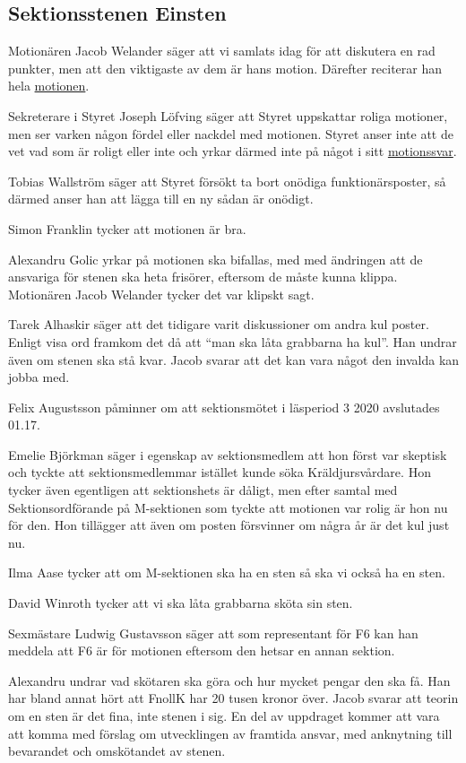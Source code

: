 \documentclass[hidelinks]{sektionsmote}
\begin{document}
\subsection{Sektionsstenen Einsten}
Motionären Jacob Welander säger att vi samlats idag för att diskutera en rad punkter, men att den viktigaste av dem är hans motion.
Därefter reciterar han hela \hyperlink{bilagor/motionfnollk.pdf.1}{motionen}.\par
Sekreterare i Styret Joseph Löfving säger att Styret uppskattar roliga motioner, men ser varken någon fördel eller nackdel med motionen.
Styret anser inte att de vet vad som är roligt eller inte och yrkar därmed inte på något i sitt \hyperlink{bilagor/motionfnollk.svar.pdf.1}{motionssvar}.\par
Tobias Wallström säger att Styret försökt ta bort onödiga funktionärsposter, så därmed anser han att lägga till en ny sådan är onödigt.\par
Simon Franklin tycker att motionen är bra.\par
Alexandru Golic yrkar på motionen ska bifallas, med med ändringen att de ansvariga för stenen ska heta frisörer, eftersom de måste kunna klippa.
Motionären Jacob Welander tycker det var klipskt sagt.\par
Tarek Alhaskir säger att det tidigare varit diskussioner om andra kul poster.
Enligt visa ord framkom det då att \enquote{man ska låta grabbarna ha kul}.
Han undrar även om stenen ska stå kvar.
Jacob svarar att det kan vara något den invalda kan jobba med.\par
Felix Augustsson påminner om att sektionsmötet i läsperiod 3 2020 avslutades 01.17.\par
Emelie Björkman säger i egenskap av sektionsmedlem att hon först var skeptisk och tyckte att sektionsmedlemmar istället kunde söka Kräldjursvårdare.
Hon tycker även egentligen att sektionshets är dåligt, men efter samtal med Sektionsordförande på M-sektionen som tyckte att motionen var rolig är hon nu för den.
Hon tillägger att även om posten försvinner om några år är det kul just nu.\par
Ilma Aase tycker att om M-sektionen ska ha en sten så ska vi också ha en sten.\par
David Winroth tycker att vi ska låta grabbarna sköta sin sten.\par
Sexmästare Ludwig Gustavsson säger att som representant för F6 kan han meddela att F6 är för motionen eftersom den hetsar en annan sektion.\par
Alexandru undrar vad skötaren ska göra och hur mycket pengar den ska få.
Han har bland annat hört att FnollK har 20 tusen kronor över.
Jacob svarar att teorin om en sten är det fina, inte stenen i sig.
En del av uppdraget kommer att vara att komma med förslag om utvecklingen av framtida ansvar, med anknytning till bevarandet och omskötandet av stenen.
\end{document}

